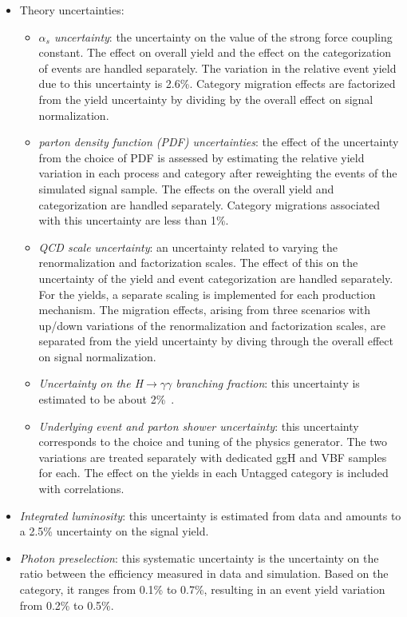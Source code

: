 \begin{itemize}
    \item Theory uncertainties:
    \begin{itemize}
        \item \textit{$\alpha_s$ uncertainty}: the uncertainty on the value of the strong force coupling constant. The effect on overall yield and the effect on the categorization of events are handled separately. The variation in the relative event yield due to this uncertainty is 2.6\%. Category migration effects are factorized from the yield uncertainty by dividing by the overall effect on signal normalization.
        \item \textit{parton density function (PDF) uncertainties}: the effect of the uncertainty from the choice of PDF is assessed by estimating the relative yield variation in each process and category after reweighting the events of the simulated signal sample. The effects on the overall yield and categorization are handled separately. Category migrations associated with this uncertainty are less than 1\%.
        \item \textit{QCD scale uncertainty}: an uncertainty related to varying the renormalization and factorization scales. The effect of this on the uncertainty of the yield and event categorization are handled separately. For the yields, a separate scaling is implemented for each production mechanism. The migration effects, arising from three scenarios with up/down variations of the renormalization and factorization scales, are separated from the yield uncertainty by diving through the overall effect on signal normalization.
        \item \textit{Uncertainty on the H$\rightarrow\gamma\gamma$ branching fraction}: this uncertainty is estimated to be about 2\%~\cite{Heinemeyer:1559921}.
        \item \textit{Underlying event and parton shower uncertainty}: this uncertainty corresponds to the choice and tuning of the physics generator. The two variations are treated separately with dedicated ggH and VBF samples for each. The effect on the yields in each Untagged category is included with correlations.
    \end{itemize}
    \item \textit{Integrated luminosity}: this uncertainty is estimated from data and amounts to a 2.5\% uncertainty on the signal yield.
    \item \textit{Photon preselection}: this systematic uncertainty is the uncertainty on the ratio between the efficiency measured in data and simulation. Based on the category, it ranges from 0.1\% to 0.7\%, resulting in an event yield variation from 0.2\% to 0.5\%.

\end{itemize}
